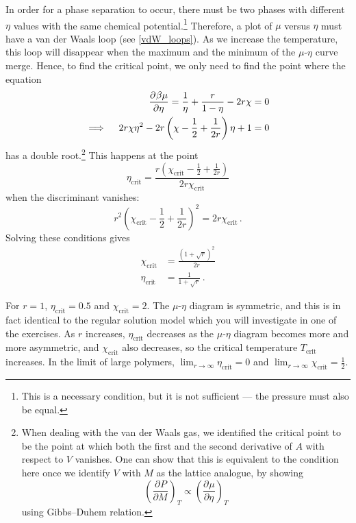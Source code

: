 \documentclass{article}
\theoremstyle{plain}\theoremheaderfont{\normalfont\bfseries}\theorembodyfont{\rmfamily}\theoremseparator{.}\newtheorem*{thm}{Theorem}\newtheorem*{law}{Law}\newtheorem*{pos}{Postulate}
\numberwithin{equation}{section}
\newcommand{\pdv}[3][]{\frac{\partial^{#1} #2}{{\partial #3}^{#1}}}
\begin{document}
    In order for a phase separation to occur, there must be two phases with different \(\eta\) values with the same chemical potential.\footnote{This is a necessary condition, but it is not sufficient --- the pressure must also be equal.} Therefore, a plot of \(\mu\) versus \(\eta\) must have a van der Waals loop (see \cref{vdW_loops}). As we increase the temperature, this loop will disappear when the maximum and the minimum of the \(\mu\)-\(\eta\) curve merge. Hence, to find the critical point, we only need to find the point where the equation
    \begin{align}
        \pdv{\beta\mu}{\eta}=\frac{1}{\eta}+\frac{r}{1-\eta}-2r\chi=0\notag\\
        \implies\quad 2r\chi\eta^2-2r\left(\chi-\frac{1}{2}+\frac{1}{2r}\right)\eta+1=0
    \end{align}
    has a double root.\footnote{When dealing with the van der Waals gas, we identified the critical point to be the point at which both the first and the second derivative of \(A\) with respect to \(V\) vanishes. One can show that this is equivalent to the condition here once we identify \(V\) with \(M\) as the lattice analogue, by showing
    \begin{equation}
        \left(\pdv{P}{M}\right)_{T}\propto\left(\pdv{\mu}{\eta}\right)_{T}
    \end{equation}
    using Gibbs--Duhem relation.} This happens at the point
    \begin{equation}
        \eta_{\text{crit}}=\frac{r\left(\chi_{\text{crit}}-\frac{1}{2}+\frac{1}{2r}\right)}{2r\chi_{\text{crit}}}
    \end{equation}
    when the discriminant vanishes:
    \begin{equation}
        r^2\left(\chi_{\text{crit}}-\frac{1}{2}+\frac{1}{2r}\right)^2=2r\chi_{\text{crit}}\,.
    \end{equation}
    Solving these conditions gives
    \begin{align}
        \chi_{\text{crit}}&=\frac{(1+\sqrt{r})^2}{2r}\\
        \eta_{\text{crit}}&=\frac{1}{1+\sqrt{r}}\,.
    \end{align}

    For \(r=1\), \(\eta_{\text{crit}}=0.5\) and \(\chi_{\text{crit}}=2\). The \(\mu\)-\(\eta\) diagram is symmetric, and this is in fact identical to the regular solution model which you will investigate in one of the exercises. As \(r\) increases, \(\eta_{\text{crit}}\) decreases as the \(\mu\)-\(\eta\) diagram becomes more and more asymmetric, and \(\chi_{\text{crit}}\) also decreases, so the critical temperature \(T_{\text{crit}}\) increases. In the limit of large polymers, \(\lim_{r\to\infty}\eta_{\text{crit}}=0\) and \(\lim_{r\to\infty}\chi_{\text{crit}}=\frac{1}{2}\).
\end{document}

